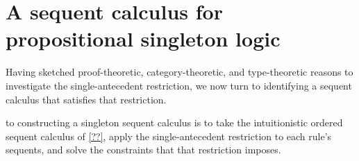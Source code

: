 \section{A sequent calculus for propositional singleton logic}\label{sec:singleton-logic:seq-calc}

Having sketched proof-theoretic, category-theoretic, and type-theoretic reasons to investigate the single-antecedent restriction, we now turn to identifying a sequent calculus that satisfies that restriction.





 to constructing a singleton sequent calculus is to take the intuitionistic ordered sequent calculus of \cref{??}, apply the single-antecedent restriction to each rule's sequents, and solve the constraints that that restriction imposes.

